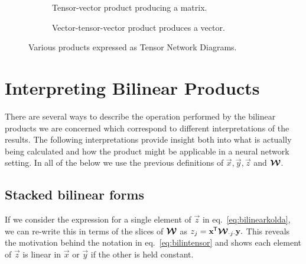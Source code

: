 \begin{figure}
\begin{subfigure}[t]{0.45\textwidth}
		\caption{Tensor-vector product producing a matrix.}
	\end{subfigure} \hfill
	\begin{subfigure}[t]{0.45\textwidth}
		\centering
		\caption{Vector-tensor-vector product produces a vector.}
		\label{fig:vanillabilintnd}
	\end{subfigure}
	\caption{Various products expressed as Tensor Network Diagrams.}
	\label{fig:tnprods}
\end{figure}

\section{Interpreting Bilinear Products}\label{sec:tensorinterps}
There are several ways to describe the operation performed by the bilinear products we are
concerned which correspond to different interpretations of the results. The following
interpretations provide insight both into what is actually being calculated and how the product might
be applicable in a neural network setting. In all of the below we use the previous definitions of
\(\vec{x}, \vec{y}, \vec{z}\) and \(\bm{\mathcal{W}}\).

\subsection{Stacked bilinear forms}
If we consider the expression for a single element of \(\vec{z}\) in eq.~\ref{eq:bilinearkolda}, 
we can re-write this in terms of the slices of \(\bm{\mathcal{W}}\) as
\(\label{eq:singlezslice}
	z_j = \mathbf{x}^{\mkern-1.5mu\mathsf{T}}\bm{\mathcal{W}}_{\cdot j \cdot}\mathbf{y}.
\) This reveals the motivation behind the notation in eq.~\eqref{eq:bilintensor}
and shows each element of \(\vec{z}\) is linear  in \(\vec{x}\) or \(\vec{y}\) if
the other is held constant.

